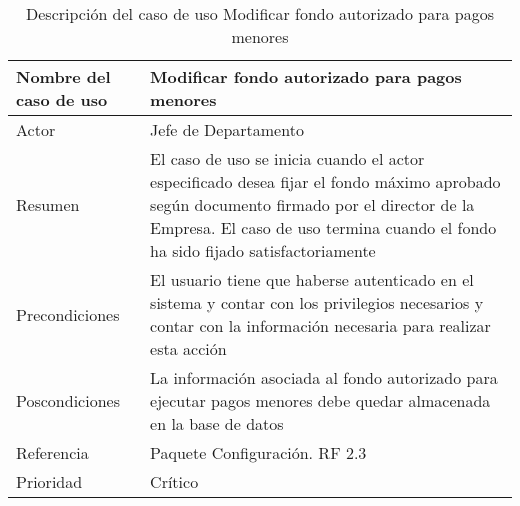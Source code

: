 \begin{table}[H]
	\sf
	\begin{supertabular}{|p{4.5cm}|p{12cm}|}
		\hline
		\textbf{Nombre del caso de uso}
		& \textbf{Modificar fondo autorizado para pagos menores} \\ \hline
		
		Actor
		& Jefe de Departamento \\ \hline
		
		Resumen
		& El caso de uso se inicia cuando el actor especificado desea fijar el fondo máximo aprobado según documento firmado por el director de la Empresa. El caso de uso termina cuando el fondo ha sido fijado satisfactoriamente \\ \hline
		
		Precondiciones
		& El usuario tiene que haberse autenticado en el sistema y contar con los privilegios necesarios y contar con la información necesaria para realizar esta acción \\ \hline
		
		Poscondiciones
		& La información asociada al fondo autorizado para ejecutar pagos menores debe quedar almacenada en la base de datos \\ \hline
		
		Referencia
		& Paquete Configuración. RF 2.3 \\ \hline
		
		Prioridad
		& Crítico \\		
		\hline
	\end{supertabular}
	\caption[Descripción del caso de uso Modificar fondo autorizado para pagos menores]{Descripción del caso de uso Modificar fondo autorizado para pagos menores}
	\label{table:CU_ModFPM}
\end{table}

